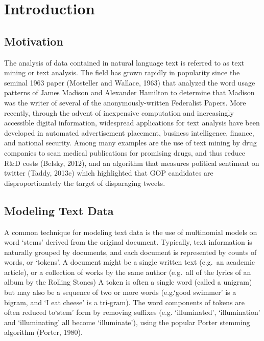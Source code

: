 \documentclass[12pt]{article}
\begin{document}
\vspace{1.5in}
\tableofcontents


\newpage


\section{Introduction}

\subsection{Motivation}


The analysis of data contained in natural language text is referred to as text mining or text analysis. 
The field has grown rapidly in popularity since the seminal 1963 paper (Mosteller and Wallace, 1963) that analyzed the
word usage patterns of James Madison and Alexander Hamilton to determine that Madison was the writer of several of the anonymously-written Federalist Papers.
More recently, through the advent of inexpensive computation and increasingly accessible digital information, widespread applications for text analysis have been developed in automated advertisement placement, business intelligence, finance, and national security. Among many examples are the use of text mining by drug companies to scan medical publications for promising drugs, and thus reduce R\&D costs (Belsky, 2012), and  an algorithm that measures political sentiment on twitter (Taddy, 2013c) which highlighted that GOP candidates are disproportionately the target of disparaging tweets. 

\subsection{Modeling Text Data}


A common technique for modeling text data is the use of multinomial models on word `stems' derived from the original document.
Typically, text information is naturally grouped by documents, and each
document is represented by counts of words, or `tokens'. A document might be a
single written text (e.g.~an academic article), or a collection of works
by the same author (e.g.~all of the lyrics of an album by the Rolling
Stones) A token is often a single word (called a unigram) but may also be
a sequence of two or more words (e.g.`good swimmer' is a
bigram, and `I eat cheese' is a tri-gram). The word components of
tokens are often reduced to`stem' form by removing suffixes (e.g.
`illuminated', `illumination' and `illuminating' all become
`illuminate'), using the popular Porter stemming algorithm (Porter, 1980).
\end{document}
